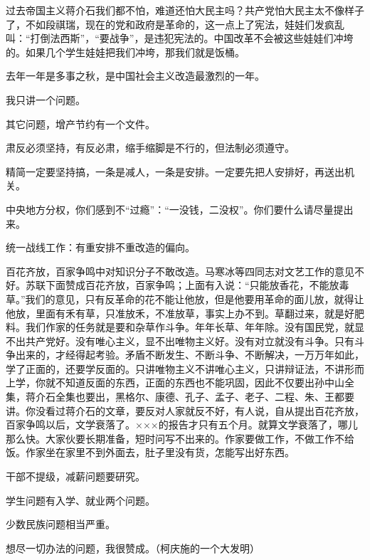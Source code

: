 过去帝国主义蒋介石我们都不怕，难道还怕大民主吗？共产党怕大民主太不像样子了，不如段祺瑞，现在的党和政府是革命的，这一点上了宪法，娃娃们发疯乱叫：“打倒法西斯”，“要战争”，是违犯宪法的。中国改革不会被这些娃娃们冲垮的。如果几个学生娃娃把我们冲垮，那我们就是饭桶。

去年一年是多事之秋，是中国社会主义改造最激烈的一年。

我只讲一个问题。

其它问题，增产节约有一个文件。

肃反必须坚持，有反必肃，缩手缩脚是不行的，但法制必须遵守。

精简一定要坚持搞，一条是减人，一条是安排。一定要先把人安排好，再送出机关。

中央地方分权，你们感到不“过瘾”：“一没钱，二没权”。你们要什么请尽量提出来。

统一战线工作：有重安排不重改造的偏向。

百花齐放，百家争鸣中对知识分子不敢改造。马寒冰等四同志对文艺工作的意见不好。苏联下面赞成百花齐放，百家争鸣；上面有入说：“只能放香花，不能放毒草。”我们的意见，只有反革命的花不能让他放，但是他要用革命的面儿放，就得让他放，里面有禾有草，只准放禾，不准放草，事实上办不到。草翻过来，就是好肥料。我们作家的任务就是要和杂草作斗争。年年长草、年年除。没有国民党，就显不出共产党好。没有唯心主义，显不出唯物主义好。没有对立就没有斗争。只有斗争出来的，才经得起考验。矛盾不断发生、不断斗争、不断解决，一万万年如此，学了正面的，还要学反面的。只讲唯物主义不讲唯心主义，只讲辩证法，不讲形而上学，你就不知道反面的东西，正面的东西也不能巩固，因此不仅要出孙中山全集，蒋介石全集也要出，黑格尔、康德、孔子、孟子、老子、二程、朱、王都要讲。你没看过蒋介石的文章，要反对人家就反不好，有人说，自从提出百花齐放，百家争鸣以后，文学衰落了。×××的报告才只有五个月。就算文学衰落了，哪儿那么快。大家伙要长期准备，短时问写不出来的。作家要做工作，不做工作不给饭。作家坐在家里不到外面去，肚子里没有货，怎能写出好东西。

干部不提级，减薪问题要研究。

学生问题有入学、就业两个问题。

少数民族问题相当严重。

想尽一切办法的问题，我很赞成。（柯庆施的一个大发明）


